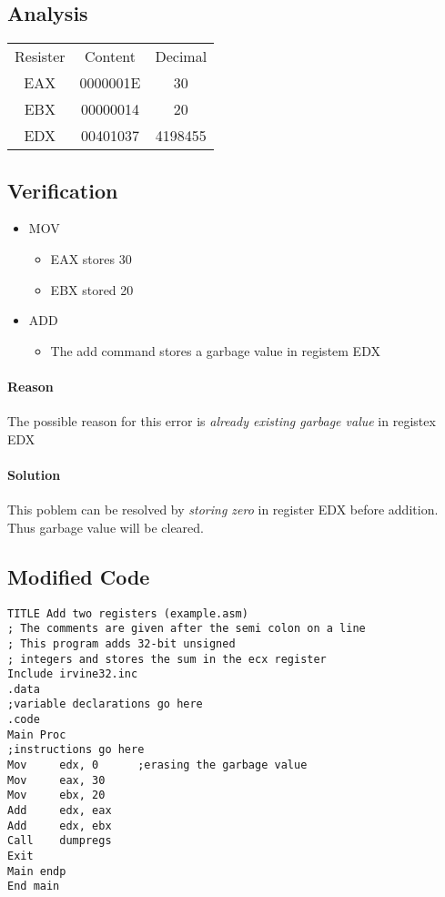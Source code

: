 \documentclass{article}
\begin{document}
\subsection{Analysis}
\begin{center}
\begin{tabular}{c c c}
	Resister & Content & Decimal\\
	EAX & 0000001E & 30 \\
	EBX & 00000014 & 20 \\
	EDX & 00401037 & 4198455
\end{tabular}
\end{center}
\subsection{Verification}
\begin{itemize}
\item MOV
	\begin{itemize}
	\item EAX stores 30
	\item EBX stored 20
	\end{itemize}
\item ADD
	\begin{itemize}
	\item The add command stores a garbage value in registem EDX
	\end{itemize}
\end{itemize}
\paragraph{Reason}
The possible reason for this error is \emph{already existing garbage value} in registex EDX
\paragraph{Solution}
This poblem can be resolved by \emph{storing zero} in register EDX before addition. Thus garbage value will be cleared.
\subsection{Modified Code}
\begin{verbatim}
TITLE Add two registers (example.asm)
; The comments are given after the semi colon on a line
; This program adds 32-bit unsigned
; integers and stores the sum in the ecx register
Include irvine32.inc
.data
;variable declarations go here
.code
Main Proc
;instructions go here
Mov		edx, 0		;erasing the garbage value
Mov 	eax, 30	
Mov 	ebx, 20
Add 	edx, eax
Add 	edx, ebx
Call 	dumpregs	
Exit
Main endp
End main
\end{verbatim}
\end{document}
